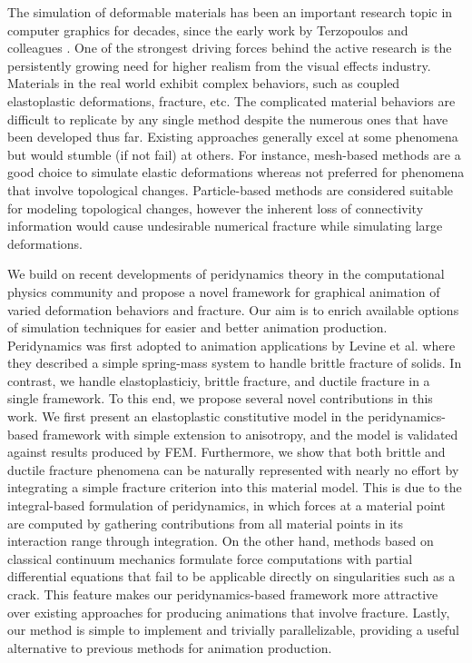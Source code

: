 The simulation of deformable materials has been an important research topic in computer graphics for decades, since the early work by Terzopoulos and colleagues \cite{Terzopoulos:1987:EDM:37402.37427}. One of the strongest driving forces behind the active research is the persistently growing need for higher realism from the visual effects industry. Materials in the real world exhibit complex behaviors, such as coupled elastoplastic deformations, fracture, etc. The complicated material behaviors are difficult to replicate by any single method despite the numerous ones that have been developed thus far. Existing approaches generally excel at some phenomena but would stumble (if not fail) at others. For instance, mesh-based methods \cite{Muller:2004:IVM:1006058.1006087,Irving:2004:IFE:1028523.1028541,Teran:2005:RQF:1073368.1073394,Sifakis:2012:FSD:2343483.2343501} are a good choice to simulate elastic deformations whereas not preferred for phenomena that involve topological changes. Particle-based methods \cite{Muller:2003:PFS:846276.846298,Pauly:2005:MAF:1073204.1073296,Stomakhin:2013:MPM:2461912.2461948} are considered suitable for modeling topological changes, however the inherent loss of connectivity information would cause undesirable numerical fracture \cite{Liu:2011:AKM:2065362.2066108, Zhu:2016MPM} while simulating large deformations.

We build on recent developments of peridynamics theory in the computational physics community \cite{Silling2000,silling2007peridynamic,mitchell2011nonlocal, emmrich2013peridynamics,madenci2014peridynamic} and propose a novel framework for graphical animation of varied deformation behaviors and fracture. Our aim is to enrich available options of simulation techniques for easier and better animation production. Peridynamics was first adopted to animation applications by Levine et al. \cite{Levine:2015:PPS:2849517.2849526} where they described a simple spring-mass system to handle brittle fracture of solids. In contrast, we handle elastoplasticiy, brittle fracture, and ductile fracture in a single framework. To this end, we propose several novel contributions in this work. We first present an elastoplastic constitutive model in the peridynamics-based framework with simple extension to anisotropy, and the model is validated against results produced by FEM. Furthermore, we show that both brittle and ductile fracture phenomena can be naturally represented with nearly no effort by integrating a simple fracture criterion into this material model. This is due to the integral-based formulation of peridynamics, in which forces at a material point are computed by gathering contributions from all material points in its interaction range through integration. On the other hand, methods based on classical continuum mechanics formulate force computations with partial differential equations that fail to be applicable directly on singularities such as a crack. This feature makes our peridynamics-based framework more attractive over existing approaches for producing animations that involve fracture. Lastly, our method is simple to implement and trivially parallelizable, providing a useful alternative to previous methods for animation production.

